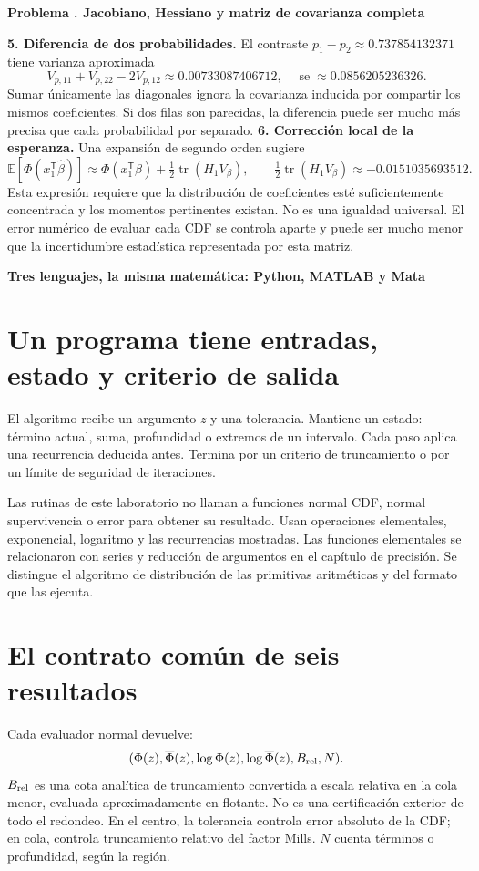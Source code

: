 \documentclass[11pt,a4paper]{article}
\newcommand{\E}{\mathbb E}
\newcommand{\T}{^{\mathsf T}}
\DeclareMathOperator{\tr}{tr}
\theoremstyle{definition}
\newcommand{\parte}[1]{\par\bigskip\Needspace{8\baselineskip}\begin{center}{\Large\bfseries\color{azul}#1}\end{center}}
\newcounter{problema}
\newenvironment{resuelto}[1]{\refstepcounter{problema}\par\medskip\Needspace{6\baselineskip}\textbf{Problema \theproblema. #1}\par}{\par\medskip}
\DeclareMathOperator{\se}{se}
\newcommand{\SF}{\overline\Phi}
\begin{document}
\begin{resuelto}{Jacobiano, Hessiano y matriz de covarianza completa}
\textbf{5. Diferencia de dos probabilidades.} El contraste $p_1-p_2\approx0.737854132371$ tiene varianza aproximada
\[
V_{p,11}+V_{p,22}-2V_{p,12}\approx0.00733087406712,\quad \se\approx0.0856205236326.
\]
Sumar únicamente las diagonales ignora la covarianza inducida por compartir los mismos coeficientes. Si dos filas son parecidas, la diferencia puede ser mucho más precisa que cada probabilidad por separado.
\textbf{6. Corrección local de la esperanza.} Una expansión de segundo orden sugiere
\[
\E[\Phi(x_1\T\widehat\beta)]\approx\Phi(x_1\T\beta)+\tfrac12\tr(H_1V_\beta),\qquad
\tfrac12\tr(H_1V_\beta)\approx-0.0151035693512.
\]
Esta expresión requiere que la distribución de coeficientes esté suficientemente concentrada y los momentos pertinentes existan. No es una igualdad universal. El error numérico de evaluar cada CDF se controla aparte y puede ser mucho menor que la incertidumbre estadística representada por esta matriz.
\end{resuelto}


\parte{Tres lenguajes, la misma matemática: Python, MATLAB y Mata}
\section{Un programa tiene entradas, estado y criterio de salida}
El algoritmo recibe un argumento $z$ y una tolerancia. Mantiene un estado: término actual, suma, profundidad o extremos de un intervalo. Cada paso aplica una recurrencia deducida antes. Termina por un criterio de truncamiento o por un límite de seguridad de iteraciones.

Las rutinas de este laboratorio no llaman a funciones normal CDF, normal supervivencia o error para obtener su resultado. Usan operaciones elementales, exponencial, logaritmo y las recurrencias mostradas. Las funciones elementales se relacionaron con series y reducción de argumentos en el capítulo de precisión. Se distingue el algoritmo de distribución de las primitivas aritméticas y del formato que las ejecuta.

\section{El contrato común de seis resultados}
Cada evaluador normal devuelve:
\[
(\Phi(z),\SF(z),\log\Phi(z),\log\SF(z),B_{\rm rel},N).
\]
$B_{\rm rel}$ es una cota analítica de truncamiento convertida a escala relativa en la cola menor, evaluada aproximadamente en flotante. No es una certificación exterior de todo el redondeo. En el centro, la tolerancia controla error absoluto de la CDF; en cola, controla truncamiento relativo del factor Mills. $N$ cuenta términos o profundidad, según la región.
\end{document}
